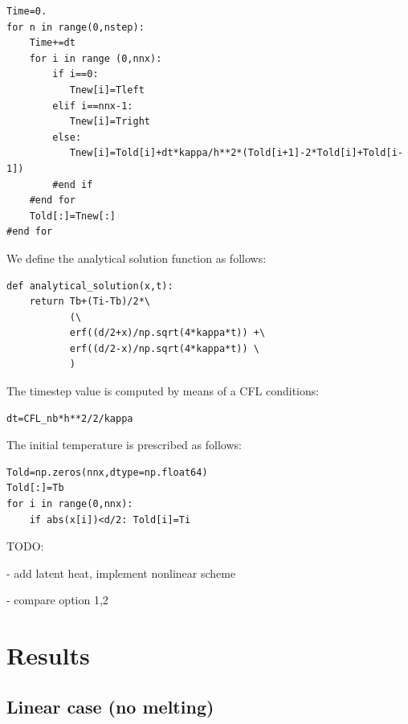 \begin{lstlisting}
Time=0.
for n in range(0,nstep):
    Time+=dt
    for i in range (0,nnx):
        if i==0:
           Tnew[i]=Tleft
        elif i==nnx-1:
           Tnew[i]=Tright
        else:
           Tnew[i]=Told[i]+dt*kappa/h**2*(Told[i+1]-2*Told[i]+Told[i-1])
        #end if
    #end for
    Told[:]=Tnew[:]
#end for
\end{lstlisting}
We define the analytical solution function as follows:
\begin{lstlisting}
def analytical_solution(x,t):
    return Tb+(Ti-Tb)/2*\
           (\
           erf((d/2+x)/np.sqrt(4*kappa*t)) +\
           erf((d/2-x)/np.sqrt(4*kappa*t)) \
           )
\end{lstlisting}
The timestep value is computed by means of a CFL conditions:
\begin{lstlisting}
dt=CFL_nb*h**2/2/kappa
\end{lstlisting}
The initial temperature is prescribed as follows:
\begin{lstlisting}
Told=np.zeros(nnx,dtype=np.float64)
Told[:]=Tb
for i in range(0,nnx):
    if abs(x[i])<d/2: Told[i]=Ti
\end{lstlisting}


TODO:

- add latent heat, implement nonlinear scheme

- compare option 1,2



\newpage
\section*{Results}

\subsection*{Linear case (no melting)}

